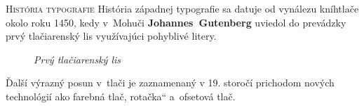 \documentclass[xcolor=dvipsnames]{beamer}
\newcommand{\myuv}[1]{\quotedblbase #1\textquotedblleft}
\begin{document}

\begin{frame}{\textsc{\large{História typografie}}}
		História západnej typografie sa datuje od vynálezu kníhtlače okolo roku 1450, kedy v~Mohuči \textbf{\color{Mycolor}Johannes~Gutenberg} uviedol do prevádzky prvý tlačiarenský lis využívajúci pohyblivé litery.
	\bigskip
	\begin{figure}[ht]
		\begin{center}
   			\caption{\textit{Prvý tlačiarenský lis}}
		\end{center}
	\end{figure}
	Ďalší výrazný posun v~tlači je zaznamenaný v 19. storočí prichodom nových technológií ako farebná tlač, \myuv{rotačka} a~ofsetová tlač.
\end{frame}

\end{document}
